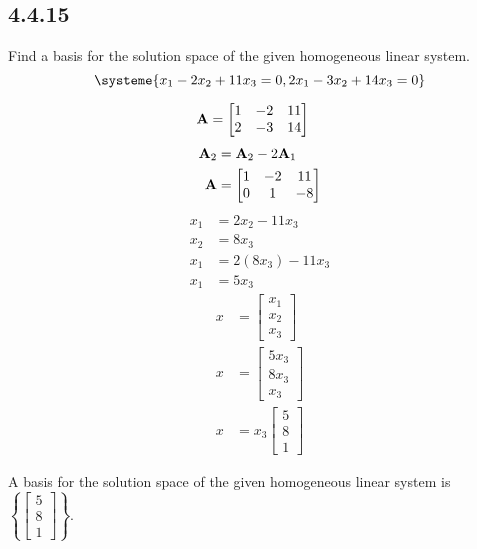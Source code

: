 \documentclass{article}
\begin{document}
\subsection{4.4.15}

Find a basis for the solution space of the given homogeneous linear system.
\begin{equation*}
	\systeme{
		x_1 - 2x_2 + 11x_3 = 0,
		2x_1 - 3x_2 + 14x_3 = 0
	}
\end{equation*}

\begin{align*}
	\mathbf{A} & =
		\begin{bmatrix}
			1 & -2 & 11 \\
			2 & -3 & 14
		\end{bmatrix}
\end{align*}
\begin{align*}
	\mathbf{A}_2 & = \mathbf{A}_2 - 2\mathbf{A}_1 \\
	\mathbf{A} & =
		\begin{bmatrix}
			1 & -2 & 11 \\
			0 & 1 & -8
		\end{bmatrix}
\end{align*}
\begin{align*}
	x_1 & = 2x_2 - 11x_3 \\
	x_2 & = 8x_3 \\
	x_1 & = 2(8x_3) - 11x_3 \\
	x_1 & = 5x_3
\end{align*}
\begin{align*}
	x & = \begin{bmatrix} x_1 \\ x_2 \\ x_3 \end{bmatrix} \\
	x & = \begin{bmatrix} 5x_3 \\ 8x_3 \\ x_3 \end{bmatrix} \\
	x & = x_3 \begin{bmatrix} 5 \\ 8 \\ 1 \end{bmatrix}
\end{align*}
\begin{mdframed}
	A basis for the solution space of the given homogeneous linear system is $ \left\{ \begin{bmatrix} 5 \\ 8 \\ 1 \end{bmatrix} \right\} $.
\end{mdframed}
\end{document}
